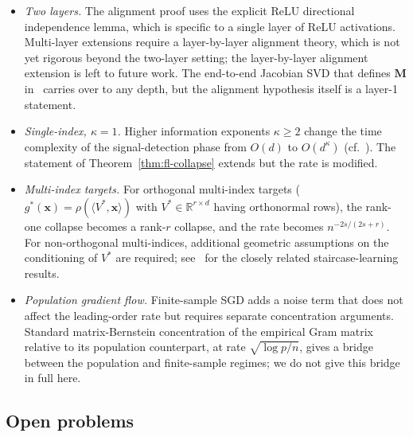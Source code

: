 \documentclass[12pt]{amsart}
\theoremstyle{definition}
\theoremstyle{remark}
\newcommand{\R}{\mathbb{R}}
\newcommand{\bx}{\mathbf{x}}
\newcommand{\bM}{\mathbf{M}}
\begin{document}
\begin{itemize}
\item \emph{Two layers.} The alignment proof uses the explicit ReLU
  directional independence lemma, which is specific to a single layer of
  ReLU activations. Multi-layer extensions require a layer-by-layer
  alignment theory, which is not yet rigorous beyond the two-layer
  setting; the layer-by-layer alignment extension is left to future work.
  The end-to-end Jacobian SVD that defines $\bM$ in~\cite{paperA} carries
  over to any depth, but the alignment hypothesis itself is a layer-1
  statement.
\item \emph{Single-index, $\kappa = 1$.} Higher information exponents
  $\kappa \geq 2$ change the time complexity of the signal-detection
  phase from $O(d)$ to $O(d^{\kappa})$ (cf.~\cite{BenArous2021}). The
  statement of Theorem~\ref{thm:fl-collapse} extends but the rate is
  modified.
\item \emph{Multi-index targets.} For orthogonal multi-index targets
  ($g^{*}(\bx) = \rho(\langle V^{*}, \bx\rangle)$ with $V^{*} \in \R^{r \times d}$
  having orthonormal rows), the rank-one collapse becomes a rank-$r$
  collapse, and the rate becomes $n^{-2s/(2s+r)}$. For non-orthogonal
  multi-indices, additional geometric assumptions on the conditioning of
  $V^{*}$ are required; see~\cite{abbe2022,MMM2022} for the closely
  related staircase-learning results.
\item \emph{Population gradient flow.} Finite-sample SGD adds a noise
  term that does not affect the leading-order rate but requires
  separate concentration arguments. Standard matrix-Bernstein concentration
  of the empirical Gram matrix relative to its population counterpart, at
  rate $\sqrt{\log p / n}$, gives a bridge between the population and
  finite-sample regimes; we do not give this bridge in full here.
\end{itemize}

\subsection{Open problems}
\end{document}
